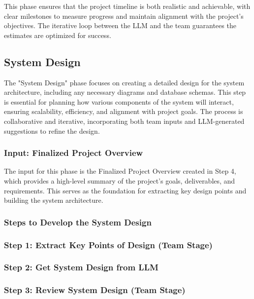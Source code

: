 \documentclass[14pt, a4paper]{article}
\begin{document}
This phase ensures that the project timeline is both realistic and achievable,
with clear milestones to measure progress and maintain alignment with the
project’s objectives. The iterative loop between the LLM and the team guarantees
the estimates are optimized for success.


\subsection{System Design}

The "System Design" phase focuses on creating a detailed design for the system
architecture, including any necessary diagrams and database schemas. This step
is essential for planning how various components of the system will interact,
ensuring scalability, efficiency, and alignment with project goals. The process
is collaborative and iterative, incorporating both team inputs and LLM-generated
suggestions to refine the design.

\subsubsection{Input: Finalized Project Overview}

The input for this phase is the Finalized Project Overview created in Step 4,
which provides a high-level summary of the project’s goals, deliverables, and
requirements. This serves as the foundation for extracting key design points and
building the system architecture.

\subsubsection{Steps to Develop the System Design}

\subsubsection*{Step 1: Extract Key Points of Design (Team Stage)}

\subsubsection*{Step 2: Get System Design from LLM}

\subsubsection*{Step 3: Review System Design (Team Stage)}
\end{document}
